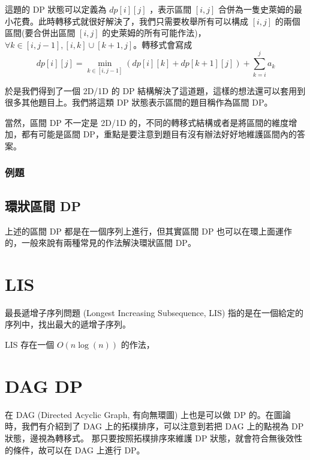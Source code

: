 \documentclass[main.tex]{subfiles}
\begin{document}
    這題的 DP 狀態可以定義為 $dp[i][j]$ ，表示區間 $[i, j]$ 合併為一隻史萊姆的最小花費。此時轉移式就很好解決了，我們只需要枚舉所有可以構成 $[i, j]$ 的兩個區間(要合併出區間 $[i, j]$ 的史萊姆的所有可能作法)， $\forall k \in [i, j-1], [i, k] \cup [k+1, j]$。轉移式會寫成
    $$dp[i][j] = \min_{k\in[i, j-1]}(dp[i][k] + dp[k+1][j]) + \sum_{k=i}^j a_k$$
    
    於是我們得到了一個 2D/1D 的 DP 結構解決了這道題，這樣的想法還可以套用到很多其他題目上。我們將這類 DP 狀態表示區間的題目稱作為區間 DP。
    
    當然，區間 DP 不一定是 2D/1D 的，不同的轉移式結構或者是將區間的維度增加，都有可能是區間 DP，重點是要注意到題目有沒有辦法好好地維護區間內的答案。
    
    \subsubsection{例題}
    
    \subsection{環狀區間 DP}
        上述的區間 DP 都是在一個序列上進行，但其實區間 DP 也可以在環上面運作的，一般來說有兩種常見的作法解決環狀區間 DP。

\section{LIS}
    最長遞增子序列問題 (Longest Increasing Subsequence, LIS) 指的是在一個給定的序列中，找出最大的遞增子序列。
    
    LIS 存在一個 $O(n\log(n))$ 的作法，

\section{DAG DP}
    在 DAG (Directed Acyclic Graph, 有向無環圖) 上也是可以做 DP 的。在圖論時，我們有介紹到了 DAG 上的拓樸排序，可以注意到若把 DAG 上的點視為 DP 狀態，邊視為轉移式。
    那只要按照拓樸排序來維護 DP 狀態，就會符合無後效性的條件，故可以在 DAG 上進行 DP。
    
\end{document}
